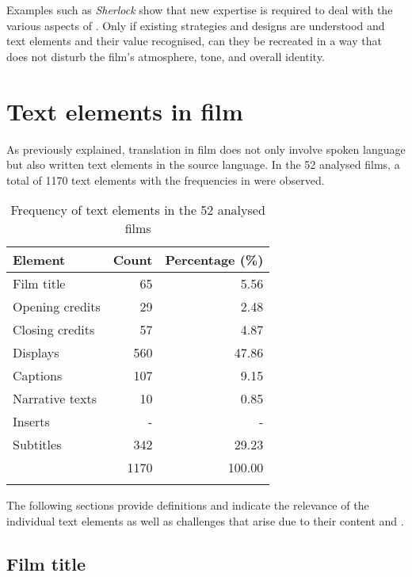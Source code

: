 \newpage 
Examples such as \textit{Sherlock} show that new expertise is required to deal with the various aspects of . Only if existing  strategies and designs are understood and text elements and their value recognised, can they be recreated in a way that does not disturb the film’s atmosphere, tone, and overall identity.

\section{Text elements in film}\label{sec:2.4}
\largerpage
As previously explained, translation in film does not only involve spoken language but also written text elements in the source language. In the 52 analysed films, a total of 1170 text elements with the frequencies in  were observed.

\begin{table}
\begin{tabularx}{.8\textwidth}{Qrr}
\lsptoprule
 Element &  Count &  Percentage (\%)\\
 \midrule 
 Film title & 65 & 5.56\\
 Opening credits & 29 & 2.48\\
 Closing credits & 57 & 4.87\\
 Displays & 560 & 47.86\\
 Captions & 107 & 9.15\\
 Narrative texts & 10 & 0.85\\
 Inserts & - & -\\
 Subtitles & 342 & 29.23\\
 \midrule 
&  1170 &  100.00\\
\lspbottomrule
\end{tabularx}
\caption{Frequency of text elements in the 52 analysed films}
\label{tab:TAB2}
\end{table}

The following sections provide definitions and indicate the relevance of the individual text elements as well as challenges that arise due to their content and .

\subsection{Film title}\label{sec:2.4.1}

